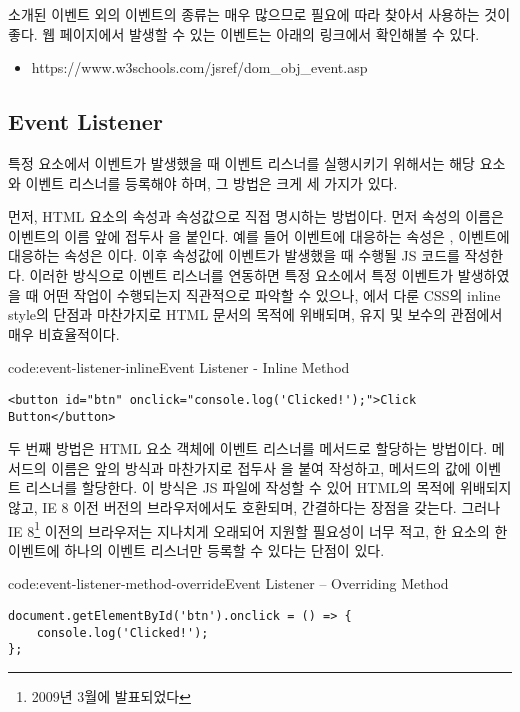 소개된 이벤트 외의 이벤트의 종류는 매우 많으므로 필요에 따라 찾아서 사용하는 것이 좋다. 웹 페이지에서 발생할 수 있는 이벤트는 아래의 링크에서 확인해볼 수 있다.

\begin{itemize}
    \item https://www.w3schools.com/jsref/dom\_obj\_event.asp
\end{itemize}

\subsection*{Event Listener}

특정 요소에서 이벤트가 발생했을 때 이벤트 리스너를 실행시키기 위해서는 해당 요소와 이벤트 리스너를 등록해야 하며, 그 방법은 크게 세 가지가 있다.

먼저, HTML 요소의 속성과 속성값으로 직접 명시하는 방법이다. 먼저 속성의 이름은 이벤트의 이름 앞에 접두사 을 붙인다. 예를 들어  이벤트에 대응하는 속성은 ,  이벤트에 대응하는 속성은 이다. 이후 속성값에 이벤트가 발생했을 때 수행될 JS 코드를 작성한다. 이러한 방식으로 이벤트 리스너를 연동하면 특정 요소에서 특정 이벤트가 발생하였을 때 어떤 작업이 수행되는지 직관적으로 파악할 수 있으나, 에서 다룬 CSS의 inline style의 단점과 마찬가지로 HTML 문서의 목적에 위배되며, 유지 및 보수의 관점에서 매우 비효율적이다.

\begin{codeenv}{code:event-listener-inline}{Event Listener - Inline Method}\begin{verbatim}
<button id="btn" onclick="console.log('Clicked!');">Click Button</button>
\end{verbatim}
\end{codeenv}

두 번째 방법은 HTML 요소 객체에 이벤트 리스너를 메서드로 할당하는 방법이다. 메서드의 이름은 앞의 방식과 마찬가지로 접두사 을 붙여 작성하고, 메서드의 값에 이벤트 리스너를 할당한다. 이 방식은 JS 파일에 작성할 수 있어 HTML의 목적에 위배되지 않고, IE 8 이전 버전의 브라우저에서도 호환되며, 간결하다는 장점을 갖는다. 그러나 IE 8\footnote{2009년 3월에 발표되었다} 이전의 브라우저는 지나치게 오래되어 지원할 필요성이 너무 적고, 한 요소의 한 이벤트에 하나의 이벤트 리스너만 등록할 수 있다는 단점이 있다.

\begin{codeenv}{code:event-listener-method-override}{Event Listener – Overriding Method}\begin{verbatim}
document.getElementById('btn').onclick = () => {
    console.log('Clicked!');
};
\end{verbatim}
\end{codeenv}

